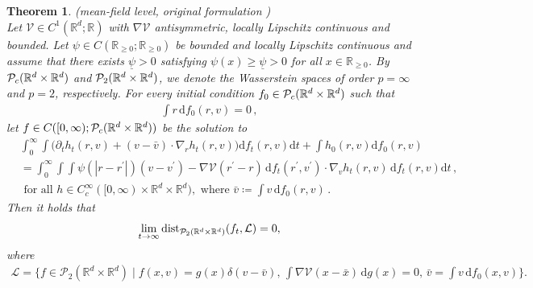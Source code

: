 \documentclass[11pt]{article}
\newtheorem{theorem}{Theorem}[section]
\newcommand{\R}[0]{\mathbb R}
\newcommand{\calP}[0]{\mathcal P}
\newcommand{\V}[0]{\mathcal V}
\newcommand{\Pp}[1]{
    \ifx #1\infty
        \mathcal{P}_{c}
    \else 
        \mathcal{P}_{#1}
    \fi 
}
\newcommand{\msolinit}[1]{f_0(#1)}
\newcommand{\msolt}[2]{f_{#1}(#2)}
\begin{document}
\begin{bibunit}[unsrtnat]
\begin{theorem}\label{thm:stabilityMFor}(mean-field level, original formulation \cite{JaTo2024})\\
Let $\mathcal{V} \in C^{1}(\R^d; \R)$ with $\nabla \mathcal{V}$ antisymmetric, locally Lipschitz continuous and bounded.
Let $\psi \in C(\R_{\geq 0}; \R_{\geq 0})$ be bounded and locally Lipschitz continuous and assume that there exists $\underline{\psi} > 0$ satisfying $\psi(x) \geq \underline{\psi} > 0$ for all $x \in \R_{\geq 0}$. By $\Pp{\infty}(\R^d \times \R^d)$ and $\Pp{2}(\R^d \times \R^d)$, we denote the Wasserstein spaces of order $p = \infty$ and $p=2$, respectively. 
For every initial condition $f_0 \in \Pp{\infty} (\R^d \times \R^d)$ such that 
\begin{align*}
    \int r \, \mathrm{d} \msolinit{r,v} = 0 \, ,
\end{align*}
let $f \in C([0,\infty); \Pp{\infty}(\R^d \times \R^d) )$ be the solution to 
\begin{align}
    &\int_0^\infty \int \big( \partial_t h_t(r,v)  + (v-\bar{v}) \cdot\nabla_r h_t(r,v) \big)\mathrm{d} \msolt{t}{r,v} \mathrm{d} t + \int h_0(r,v)\mathrm{d} \msolinit{r,v} \nonumber \\
	&= \int_0^\infty \int \int\psi(| r -  r^\prime |)(v - v^\prime) - \nabla \V(r^\prime - r) \, \mathrm{d} \msolt{t}{r^\prime,v^\prime} \cdot \nabla_v h_t(r,v) \, \mathrm{d} \msolt{t}{r,v} \mathrm{d} t \, , \nonumber \\
    &\text{ for all } h \in C_c^\infty([0,\infty) \times \R^d \times \R^d), \text{ where } \bar{v} \coloneq \int v \, \mathrm{d}\msolinit{r,v} \, . \label{eq:weakformintro}
\end{align}
Then it holds that
\begin{align*}
\lim\limits_{t\rightarrow \infty}\mathrm{dist}_{\Pp{2}(\R^d \times \R^d) } (f_t, \mathcal L) =0,
\end{align*}
where 
\begin{align*}
\mathcal L = \Big\{ f \in \calP_2(\R^d \times \R^d) \mid f(x,v)=g(x)\delta(v-\bar v),\,  \int \nabla \mathcal{V}(x-\bar x)   \, \mathrm{d} g(x) = 0, \, \bar v = \int v \,  \mathrm{d} f_0(x,v) \Big\}.
\end{align*}
\end{theorem}


\end{bibunit}
\end{document}

